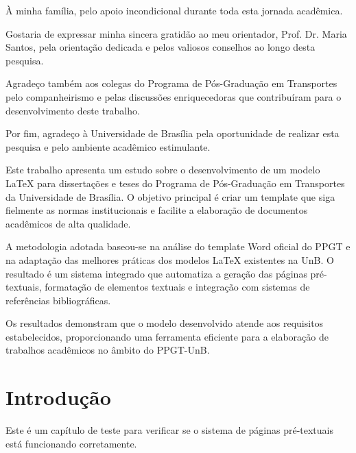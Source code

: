 \documentclass[mestrado,onehalfspacing]{UnB-PPGT}
\begin{document}
\pretextual
\folharosto


\begin{dedicatoria}
À minha família, pelo apoio incondicional durante toda esta jornada acadêmica.
\end{dedicatoria}

\begin{agradecimentos}
Gostaria de expressar minha sincera gratidão ao meu orientador, Prof. Dr. Maria Santos, pela orientação dedicada e pelos valiosos conselhos ao longo desta pesquisa.

Agradeço também aos colegas do Programa de Pós-Graduação em Transportes pelo companheirismo e pelas discussões enriquecedoras que contribuíram para o desenvolvimento deste trabalho.

Por fim, agradeço à Universidade de Brasília pela oportunidade de realizar esta pesquisa e pelo ambiente acadêmico estimulante.
\end{agradecimentos}

\begin{resumo}
Este trabalho apresenta um estudo sobre o desenvolvimento de um modelo LaTeX para dissertações e teses do Programa de Pós-Graduação em Transportes da Universidade de Brasília. O objetivo principal é criar um template que siga fielmente as normas institucionais e facilite a elaboração de documentos acadêmicos de alta qualidade.

A metodologia adotada baseou-se na análise do template Word oficial do PPGT e na adaptação das melhores práticas dos modelos LaTeX existentes na UnB. O resultado é um sistema integrado que automatiza a geração das páginas pré-textuais, formatação de elementos textuais e integração com sistemas de referências bibliográficas.

Os resultados demonstram que o modelo desenvolvido atende aos requisitos estabelecidos, proporcionando uma ferramenta eficiente para a elaboração de trabalhos acadêmicos no âmbito do PPGT-UnB.
\end{resumo}

\begin{abstract}
This work presents a study on the development of a LaTeX template for dissertations and theses of the Graduate Program in Transportation at the University of Brasília. The main objective is to create a template that faithfully follows institutional standards and facilitates the preparation of high-quality academic documents.

The methodology adopted was based on the analysis of the official Word template of PPGT and the adaptation of best practices from existing LaTeX models at UnB. The result is an integrated system that automates the generation of pre-textual pages, formatting of textual elements and integration with bibliographic reference systems.

The results demonstrate that the developed model meets the established requirements, providing an efficient tool for the preparation of academic works within the scope of PPGT-UnB.
\end{abstract}

\textual

\chapter{Introdução}

Este é um capítulo de teste para verificar se o sistema de páginas pré-textuais está funcionando corretamente.
\end{document}
